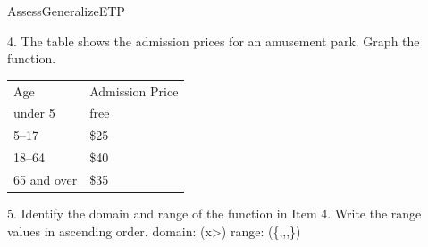 \documentclass{article}
\newenvironment{te-addendum}[2]{}{}     %
\newcommand{\answer}[1]{}               %
\newcommand{\placeholder}[2]{}          %
\newcommand{\te}[1]{}                   %
\begin{document}
\begin{te-addendum}{Assess}{GeneralizeETP}
\answer{3. (f(x)=\begin{cases}-3(x+(-9)),&x\leq9\\3(x+(-9)),&x>9\end{cases})}
4. The table shows the admission prices for an amusement park. Graph the function.
\begin{tabular}{ll}
Age & Admission Price \\
under 5 & free \\
5--17 & \$25 \\
18--64 & \$40 \\
65 and over & \$35 \\
\end{tabular}
\answer{4. See graph.}
\placeholder{graph}{Quiz 4 magenta step graph: y=0 on (0,5), open circles at (0,0),(5,0); y=25 from filled (5,25) to open (18,25); y=40 from filled (18,40) to open (65,40); y=35 from filled (65,35) with rightward arrow. x-axis Age (years), labels 0,10,20,30,40,50,60, grid 5; y-axis Admission price (dollars), labels 0,10,20,30,40, grid 5. Arrowed x/y axes, origin O; visible x=-5 to 70,y=-5 to 45.}
5. Identify the domain and range of the function in Item 4. Write the range values in ascending order.
domain: (x>)
range: (\{,,,\})
\answer{5. domain: (x>0); range: (\{0,25,35,40\}).}
\te{Lesson Quiz is available at SavvasRealize.com. enVision Algebra 2 • Assessment Sourcebook. Copyright © Savvas Learning Company LLC. All Rights Reserved.}
\end{te-addendum}
\end{document}
